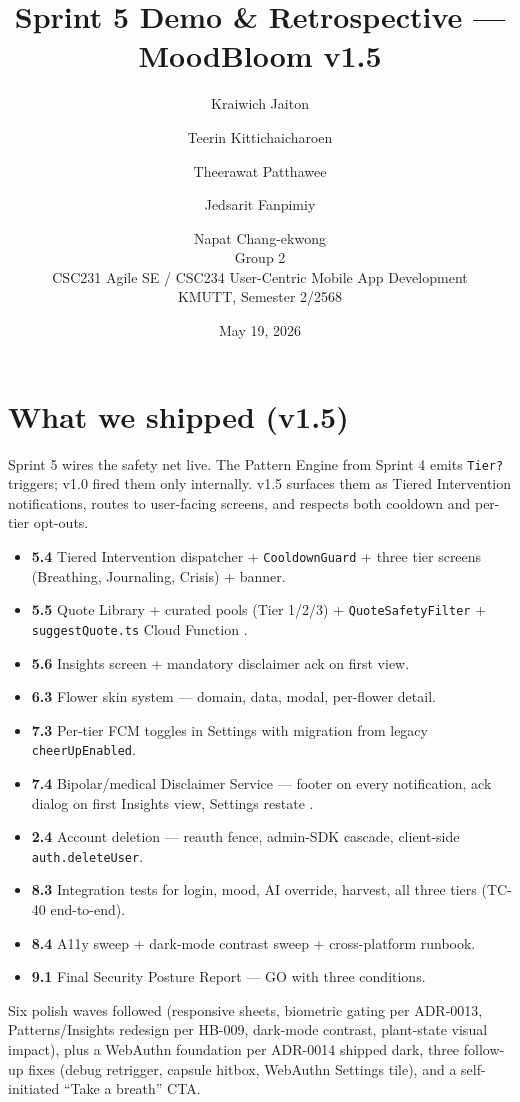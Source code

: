 \documentclass[11pt,a4paper]{article}
\title{Sprint 5 Demo \& Retrospective --- MoodBloom v1.5}
\author{
  Kraiwich Jaiton \and
  Teerin Kittichaicharoen \and
  Theerawat Patthawee \and
  Jedsarit Fanpimiy \and
  Napat Chang-ekwong \\[1ex]
  \small Group 2 \\
  \small CSC231 Agile SE / CSC234 User-Centric Mobile App Development \\
  \small KMUTT, Semester 2/2568
}
\date{May 19, 2026}
\begin{document}
\maketitle
\thispagestyle{empty}
\newpage

\section{What we shipped (v1.5)}

Sprint 5 wires the safety net live. The Pattern Engine from Sprint 4 emits
\texttt{Tier?} triggers; v1.0 fired them only internally. v1.5 surfaces
them as Tiered Intervention notifications, routes to user-facing screens,
and respects both cooldown and per-tier opt-outs.

\begin{itemize}[leftmargin=*]
\item \textbf{5.4} Tiered Intervention dispatcher + \texttt{CooldownGuard} + three tier screens (Breathing, Journaling, Crisis) + banner.
\item \textbf{5.5} Quote Library + curated pools (Tier 1/2/3) + \texttt{QuoteSafetyFilter} + \texttt{suggestQuote.ts} Cloud Function \autocite{nahum2018jitai}.
\item \textbf{5.6} Insights screen + mandatory disclaimer ack on first view.
\item \textbf{6.3} Flower skin system --- domain, data, modal, per-flower detail.
\item \textbf{7.3} Per-tier FCM toggles in Settings with migration from legacy \texttt{cheerUpEnabled}.
\item \textbf{7.4} Bipolar/medical Disclaimer Service --- footer on every notification, ack dialog on first Insights view, Settings restate \autocite{stanley2012safety}.
\item \textbf{2.4} Account deletion --- reauth fence, admin-SDK cascade, client-side \texttt{auth.deleteUser}.
\item \textbf{8.3} Integration tests for login, mood, AI override, harvest, all three tiers (TC-40 end-to-end).
\item \textbf{8.4} A11y sweep + dark-mode contrast sweep + cross-platform runbook.
\item \textbf{9.1} Final Security Posture Report --- GO with three conditions.
\end{itemize}

Six polish waves followed (responsive sheets, biometric gating per
ADR-0013, Patterns/Insights redesign per HB-009, dark-mode contrast,
plant-state visual impact), plus a WebAuthn foundation per ADR-0014
shipped dark, three follow-up fixes (debug retrigger, capsule hitbox,
WebAuthn Settings tile), and a self-initiated ``Take a breath'' CTA.
\end{document}
